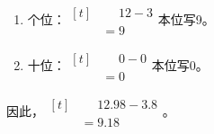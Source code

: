 {\begin{enumerate}[leftmargin=1.7em,itemsep=5pt,topsep=0pt]
\item 个位：\(\begin{aligned}[t]&\phantom{={}}12-3\\&=9\end{aligned}\)\quad 本位写9。
\item 十位：\(\begin{aligned}[t]&\phantom{={}}0-0\\&=0\end{aligned}\)\quad 本位写0。
\end{enumerate}
\par\smallskip
因此，\(\begin{aligned}[t]&\phantom{={}}12.98-3.8\\&=9.18\end{aligned}\)。
\par\medskip

}
